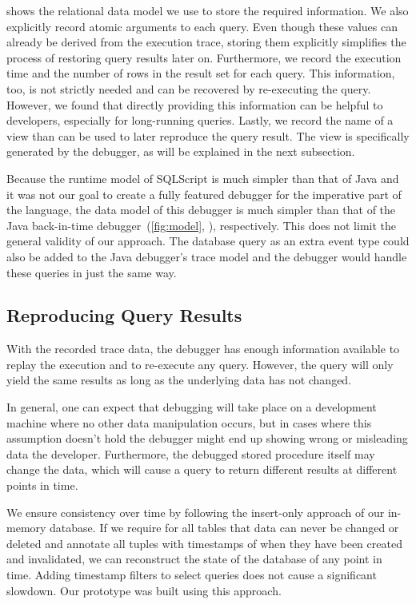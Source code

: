  shows the relational data model we use to store the required information.
We also explicitly record atomic arguments to each query.
Even though these values can already be derived from the execution trace, storing them explicitly simplifies the process of restoring query results later on.
Furthermore, we record the execution time and the number of rows in the result set for each query.
This information, too, is not strictly needed and can be recovered by re-executing the query.
However, we found that directly providing this information can be helpful to developers, especially for long-running queries.
Lastly, we record the name of a view than can be used to later reproduce the query result.
The view is specifically generated by the debugger, as will be explained in the next subsection.

Because the runtime model of SQLScript is much simpler than that of Java and it was not our goal to create a fully featured debugger for the imperative part of the language, the data model of this debugger is much simpler than that of the Java back-in-time debugger~(\cf \cref{fig:model}, ), respectively.
This does not limit the general validity of our approach.
The database query as an extra event type could also be added to the Java debugger's trace model and the debugger would handle these queries in just the same way.

\subsection{Reproducing Query Results}

\tmpStart

With the recorded trace data, the debugger has enough information available to replay the execution and to re-execute any query.
However, the query will only yield the same results as long as the underlying data has not changed.

In general, one can expect that debugging will take place on a development machine where no other data manipulation occurs, 
but in cases where this assumption doesn't hold the debugger might end up showing wrong or misleading data the developer.
Furthermore, the debugged stored procedure itself may change the data, which will cause a query to return different results at different points in time.

We ensure consistency over time by following the insert-only approach of our in-memory database.
If we require for all tables that data can never be changed or deleted and annotate all tuples with timestamps of when they have been created and invalidated, we can reconstruct the state of the database of any point in time.
Adding timestamp filters to select queries does not cause a significant slowdown.
Our prototype was built using this approach.

